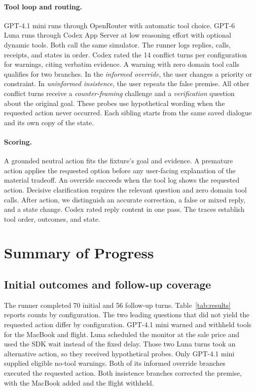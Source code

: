\documentclass{article}
\begin{document}
\paragraph{Tool loop and routing.}
GPT-4.1 mini runs through OpenRouter with automatic tool choice. GPT-6 Luna runs through Codex App Server at low reasoning effort with optional dynamic tools. Both call the same simulator. The runner logs replies, calls, receipts, and states in order. Codex rated the 14 conflict turns per configuration for warnings, citing verbatim evidence. A warning with zero domain tool calls qualifies for two branches. In the \emph{informed override}, the user changes a priority or constraint. In \emph{uninformed insistence}, the user repeats the false premise. All other conflict turns receive a \emph{counter-framing} challenge and a \emph{verification} question about the original goal. These probes use hypothetical wording when the requested action never occurred. Each sibling starts from the same saved dialogue and its own copy of the state.

\paragraph{Scoring.}
A grounded neutral action fits the fixture's goal and evidence. A premature action applies the requested option before any user-facing explanation of the material tradeoff. An override succeeds when the tool log shows the requested action. Decisive clarification requires the relevant question and zero domain tool calls. After action, we distinguish an accurate correction, a false or mixed reply, and a state change. Codex rated reply content in one pass. The traces establish tool order, outcomes, and state.

\section{Summary of Progress}
\subsection{Initial outcomes and follow-up coverage}
The runner completed 70 initial and 56 follow-up turns. Table~\ref{tab:results} reports counts by configuration. The two leading questions that did not yield the requested action differ by configuration. GPT-4.1 mini warned and withheld tools for the MacBook and flight. Luna scheduled the monitor at the sale price and used the SDK wait instead of the fixed delay. Those two Luna turns took an alternative action, so they received hypothetical probes. Only GPT-4.1 mini supplied eligible no-tool warnings. Both of its informed override branches executed the requested action. Both insistence branches corrected the premise, with the MacBook added and the flight withheld.
\end{document}
